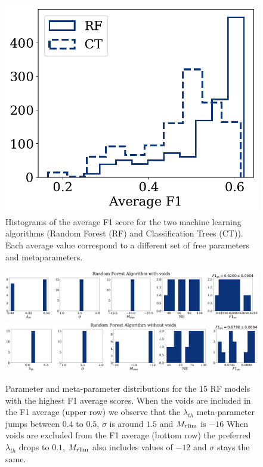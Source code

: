 \documentclass[usenatbib]{mnras}
\begin{document}
\begin{figure}
    \includegraphics[scale=0.55]{Figs/p_hist_f1.pdf}
    \caption{Histograms of the average F1 score for the two machine
      learning algorithms (Random Forest (RF) and Classification Trees (CT)). 
      Each average value correspond to a different set of free parameters and metaparameters.}
    \label{fig:methods}
\end{figure}


\begin{figure}
\centering
    \includegraphics[scale=0.23]{Figs/p_features_Forest_F1_av.pdf}
    \includegraphics[scale=0.23]{Figs/p_features_Forest_F1_av_no_voids.pdf}
    \caption{Parameter and meta-parameter distributions for the 15 RF models with the highest F1 average scores. When the voids are included in the F1 average (upper row) we observe that  the $\lambda_{th}$ meta-parameter jumps between $0.4$ to $0.5$, $\sigma$ is around $1.5$ and $M_{r \rm lim}$ is $-16$
    When voids are excluded from the F1 average  (bottom row) the preferred  $\lambda_{th}$ drops to $0.1$, $M_{r \rm lim}$ also includes values of $-12$ and $\sigma$ stays the same.} 
    \label{fig:features_score}    
\end{figure}
\end{document}
